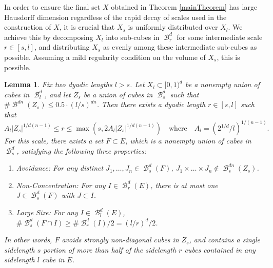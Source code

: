 \documentclass[dvipsnames,letterpaper,12pt]{article}
\numberwithin{equation}{section}
\theoremstyle{plain}
\newtheorem{lemma}{Lemma}
\theoremstyle{remark}
\DeclareMathOperator{\B}{\mathcal{B}}
\begin{document}
In order to ensure the final set $X$ obtained in Theorem \ref{mainTheorem} has large Hausdorff dimension regardless of the rapid decay of scales used in the construction of $X$, it is crucial that $X_s$ is uniformly distributed over $X_l$. We achieve this by decomposing $X_l$ into sub-cubes in $\B_r^d$ for some intermediate scale $r \in [s,l]$, and distributing $X_s$ as evenly among these intermediate sub-cubes as possible. Assuming a mild regularity condition on the volume of $X_s$, this is possible.

\begin{lemma}\label{discretelemma}
	Fix two dyadic lengths $l > s$. Let $X_l \subset [0,1)^d$ be a nonempty union of cubes in $\B^d_l$, and let $Z_s$ be a union of cubes in $\B^d_s$ such that $\# \B^{dn}(Z_s) \leq 0.5 \cdot (l/s)^{dn}$. Then there exists a dyadic length $r \in [s,l]$ such that
	\begin{equation} \label{rBound}
		A_l |Z_s|^{1/d(n-1)} \leq r \leq \max(s, 2 A_l |Z_s|^{1/d(n-1)})\quad \text{where}\quad A_l = (2^{1/d}/l)^{1/(n-1)}.
	\end{equation}
	For this scale, there exists a set $F \subset E$, which is a nonempty union of cubes in $\B^d_s$, satisfying the following three properties:
	\begin{enumerate}
		\item\label{avoidanceItem} \emph{Avoidance}: For any distinct $J_1, \dots, J_n \in \B^d_s(F)$, $J_1 \times \dots \times J_n \not \in \B_s^{dn}(Z_s)$.
		\item\label{nonConcentrationItem} \emph{Non-Concentration}: For any $I \in \B_r^d(E)$, there is at most one $J \in \B_s^d(F)$ with $J \subset I$.
		\item\label{largeSizeItem} \emph{Large Size}: For any $I \in \B^d_l(E)$, $\# \B^d_s(F \cap I) \geq \# \B^d_r(I) / 2 = (l/r)^d / 2$.
	\end{enumerate}
	In other words, $F$ avoids strongly non-diagonal cubes in $Z_s$, and contains a single sidelength $s$ portion of more than half of the sidelength $r$ cubes contained in any sidelength $l$ cube in $E$.
\end{lemma}
\end{document}
